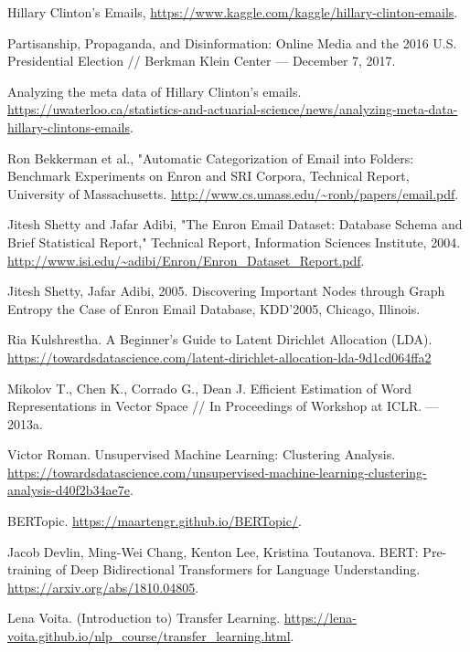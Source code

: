 

\begin{thebibliography}{3}

Hillary Clinton's Emails,
\url{https://www.kaggle.com/kaggle/hillary-clinton-emails}.

Partisanship, Propaganda, and Disinformation: Online Media and the 2016 U.S. Presidential Election // Berkman Klein Center — December 7, 2017.

Analyzing the meta data of Hillary Clinton’s emails.
\url{https://uwaterloo.ca/statistics-and-actuarial-science/news/analyzing-meta-data-hillary-clintons-emails}.

Ron Bekkerman et al., "Automatic Categorization of Email into Folders:
Benchmark Experiments on Enron and SRI Corpora, Technical Report,
University of Massachusetts. 
\url{http://www.cs.umass.edu/~ronb/papers/email.pdf}.

Jitesh Shetty and Jafar Adibi, "The Enron Email Dataset: Database Schema and Brief Statistical Report," Technical Report, Information Sciences Institute, 2004. \url{http://www.isi.edu/~adibi/Enron/Enron_Dataset_Report.pdf}.

Jitesh Shetty, Jafar Adibi, 2005. Discovering Important Nodes
through Graph Entropy the Case of Enron Email Database,
KDD’2005, Chicago, Illinois.

Ria Kulshrestha. A Beginner’s Guide to Latent Dirichlet Allocation (LDA). \url{https://towardsdatascience.com/latent-dirichlet-allocation-lda-9d1cd064ffa2}

Mikolov T., Chen K., Corrado G., Dean J. Efficient Estimation of Word Representations in Vector Space // In Proceedings of Workshop at ICLR. — 2013a.

Victor Roman. Unsupervised Machine Learning: Clustering Analysis. \url{https://towardsdatascience.com/unsupervised-machine-learning-clustering-analysis-d40f2b34ae7e}.

BERTopic. \url{https://maartengr.github.io/BERTopic/}.

Jacob Devlin, Ming-Wei Chang, Kenton Lee, Kristina Toutanova. BERT: Pre-training of Deep Bidirectional Transformers for Language Understanding. 
\url{https://arxiv.org/abs/1810.04805}.

Lena Voita. 
(Introduction to) Transfer Learning. \url{https://lena-voita.github.io/nlp_course/transfer_learning.html}.


\end{thebibliography}
